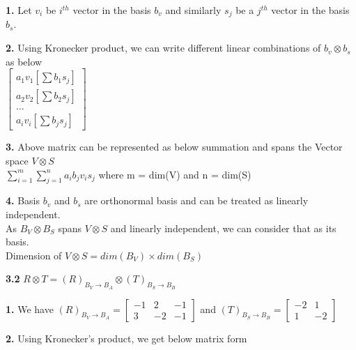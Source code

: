 \documentclass [12pt]{article}
\theoremstyle{definition}
\begin{document}
\phantom{1em} {\bf 1.} Let $v_{i}$ be $i^{th}$ vector in the basis $b_{v}$ and similarly $s_{j}$ be a $j^{th}$ vector in the basis $b_{s}$.

\phantom{1em} {\bf 2.} Using Kronecker product, we can write different linear combinations of $b_{v} \otimes b_{s}$ as below\\
\phantom{1000em} $\begin{bmatrix} a_{1}v_{1}[\sum b_{1}s_{j}] \\ a_{2}v_{2} [\sum b_{2}s_{j}]\\ \ldots \\ a_{i}v_{i} [\sum b_{j}s_{j}]\end{bmatrix}$

\phantom{1em} {\bf 3.} Above matrix can be represented as below summation and spans the Vector space $V \otimes S$\\
\phantom{1000em} $\sum\limits_{i=1}^m\sum\limits_{j=1}^n a_{i}b_{j}v_{i}s_{j}$ where m = dim(V) and n = dim(S)

\phantom{1em} {\bf 4.} Basis $b_{v}$ and $b_{s}$ are orthonormal basis and can be treated as linearly independent. \\
\phantom{1000em} As $B_{V} \otimes B_{S}$ spans $V \otimes S$ and linearly independent, we can consider that as its basis.\\
\phantom{1000em} Dimension of $V \otimes S = dim(B_{V}) \times dim(B_{S})$

{\bf 3.2} $R \otimes T = (R)_{B_{V} \rightarrow B_{A}} \otimes (T)_{B_{S} \rightarrow B_{B}}$

\phantom{1em} {\bf 1.} We have $(R)_{B_{V} \rightarrow B_{A}} = \begin{bmatrix} -1 & 2 & -1 \\ 3 & -2 & -1 \end{bmatrix}$ and $(T)_{B_{S} \rightarrow B_{B}} = \begin{bmatrix}  -2 & 1\\ 1 & -2 \end{bmatrix}$

\phantom{1em} {\bf 2.} Using Kronecker's product, we get below matrix form\\
\end{document}
